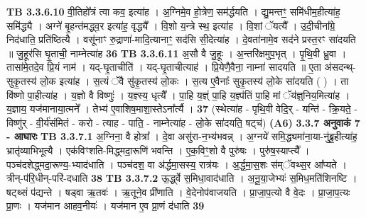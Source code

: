 \documentclass[17pt]{extarticle}
\begin{document}
{{{{{{{{{{{{{{{{{{{                                \textbf{ TB 3.3.6.10} \newline
                  वी॒तिहो᳚त्रं त्वा कव॒ इत्या॑ह । अ॒ग्निमे॒व हो॒त्रेण॒ सम॑र्द्धयति । द्यु॒मन्तꣳ॒॒ समि॑धीम॒हीत्या॑ह॒ समि॑द्ध्यै । अग्ने॑ बृ॒हन्त॑मद्ध्व॒र इत्या॑ह॒ वृद्ध्यै᳚ । वि॒शो य॒न्त्रे स्थ॒ इत्या॑ह । वि॒शां ॅयत्यै᳚ । उ॒दी॒चीना᳚ग्रे॒ निद॑धाति॒ प्रति॑ष्ठित्यै । वसू॑नाꣳ रु॒द्राणा॑-मादि॒त्यानाꣳ॒॒ सद॑सि सी॒देत्या॑ह । दे॒वता॑नामे॒व सद॑ने प्रस्त॒रꣳ सा॑दयति ॥ जु॒हूर॑सि घृ॒ताची॒ नाम्नेत्या॑ह \textbf{ 36} \newline
                  \newline
                                \textbf{ TB 3.3.6.11} \newline
                  अ॒सौ वै जु॒हूः । अ॒न्तरि॑क्षमुप॒भृत् । पृ॒थि॒वी ध्रु॒वा । तासा॑मे॒तदे॒व प्रि॒यं नाम॑ । यद्-घृ॒ताचीति॑ । यद्-घृ॒ताचीत्याह॑ । प्रि॒येणै॒वैना॒ नाम्ना॑ सादयति ॥ ए॒ता अ॑सदन्थ्-सुकृ॒तस्य॑ लो॒क इत्या॑ह । स॒त्यं ॅवै सु॑कृ॒तस्य॑ लो॒कः । स॒त्य ए॒वैनाः᳚ सुकृ॒तस्य॑ लो॒के सा॑दयति ( ) । ता वि॑ष्णो पा॒हीत्या॑ह । य॒ज्ञो वै विष्णुः॑ । य॒ज्ञ्स्य॒ धृत्यै᳚ । पा॒हि य॒ज्ञ्ं पा॒हि य॒ज्ञ्प॑तिं पा॒हि मां ॅय॑ज्ञ्॒निय॒मित्या॑ह । य॒ज्ञाय॒ यज॑मानाया॒त्मने᳚ । तेभ्य॑ ए॒वाशिष॒माशा॒स्तेऽना᳚र्त्यै । \textbf{ 37} \newline
                  \newline
                                    (स्थेत्या॑ह - पृथि॒वी वेदि॒र् - यन्ति॑ - क्रि॒यते॒ - विष्णु॑र् - वी॒र्य॑संमितं - करो - त्याह - पाति॒ - नाम्नेत्या॑ह - लो॒के सा॑दयति॒ षट्च॑) \textbf{(A6)} \newline \newline
                \textbf{ 3.3.7     अनुवाकं   7 - आघारः} \newline
                                \textbf{ TB 3.3.7.1} \newline
                  अ॒ग्निना॒ वै होत्रा᳚ । दे॒वा असु॑रा-न॒भ्य॑भवन्न् । अ॒ग्नये॑ समि॒द्ध्यमा॑ना॒या-नु॑ब्रू॒हीत्या॑ह॒ भ्रातृ॑व्याभिभूत्यै । एक॑विꣳशति-मिद्ध्मदा॒रूणि॑ भवन्ति । ए॒क॒विꣳ॒॒शो वै पुरु॑षः । पुरु॑ष॒स्याप्त्यै᳚ । पञ्च॑दशेद्ध्मदा॒रूण्य॒-भ्याद॑धाति । पञ्च॑दश॒ वा अ॑र्द्धमा॒सस्य॒ रात्र॑यः । अ॒र्द्ध॒मा॒स॒शः स॑म्ॅवथ्स॒र आ᳚प्यते । त्रीन्-प॑रि॒धीन्-परि॑-दधाति \textbf{ 38} \newline
                  \newline
                                \textbf{ TB 3.3.7.2} \newline
                  ऊ॒र्द्ध्वे स॒मिधा॒वाद॑धाति । अ॒नू॒या॒जेभ्यः॑ स॒मिध॒मति॑शिनष्टि । षट्थ्सं प॑द्यन्ते । षड्वा ऋ॒तवः॑ । ऋ॒तूने॒व प्री॑णाति । वे॒देनोप॑वाजयति । प्रा॒जा॒प॒त्यो वै वे॒दः । प्रा॒जा॒प॒त्यः प्रा॒णः । यज॑मान आहव॒नीयः॑ । यज॑मान ए॒व प्रा॒णं द॑धाति \textbf{ 39} \newline
}}}}}}}}}}}}}}}}}}}
\end{document}
